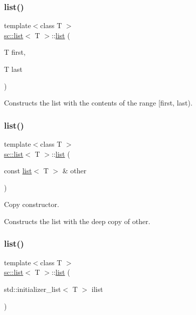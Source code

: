 \subsubsection{\texorpdfstring{list()}{list()}\hspace{0.1cm}{\footnotesize\ttfamily [3/5]}}
{\footnotesize\ttfamily template$<$class T $>$ \\
\mbox{\hyperlink{classsc_1_1list}{sc\+::list}}$<$ T $>$\+::\mbox{\hyperlink{classsc_1_1list}{list}} (\begin{DoxyParamCaption}\item[{T}]{first,  }\item[{T}]{last }\end{DoxyParamCaption})}



Constructs the list with the contents of the range \mbox{[}first, last). 

\mbox{\label{classsc_1_1list_a1fe5b60798e979cb0a5b1663d64ec69b}} 
\subsubsection{\texorpdfstring{list()}{list()}\hspace{0.1cm}{\footnotesize\ttfamily [4/5]}}
{\footnotesize\ttfamily template$<$class T $>$ \\
\mbox{\hyperlink{classsc_1_1list}{sc\+::list}}$<$ T $>$\+::\mbox{\hyperlink{classsc_1_1list}{list}} (\begin{DoxyParamCaption}\item[{const \mbox{\hyperlink{classsc_1_1list}{list}}$<$ T $>$ \&}]{other }\end{DoxyParamCaption})}



Copy constructor. 

Constructs the list with the deep copy of other. \mbox{\label{classsc_1_1list_ae85152bcf538c929944790b1c30d3b22}} 
\subsubsection{\texorpdfstring{list()}{list()}\hspace{0.1cm}{\footnotesize\ttfamily [5/5]}}
{\footnotesize\ttfamily template$<$class T $>$ \\
\mbox{\hyperlink{classsc_1_1list}{sc\+::list}}$<$ T $>$\+::\mbox{\hyperlink{classsc_1_1list}{list}} (\begin{DoxyParamCaption}\item[{std\+::initializer\+\_\+list$<$ T $>$}]{ilist }\end{DoxyParamCaption})}



